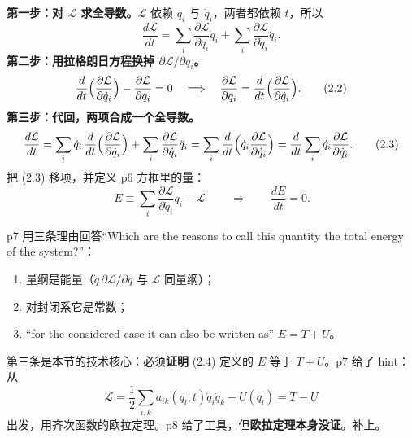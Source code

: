 \documentclass[11pt]{ctexart}
\begin{document}
\textbf{第一步：对 $\mathcal{L}$ 求全导数。}$\mathcal{L}$ 依赖 $q_i$ 与 $\dot q_i$，两者都依赖 $t$，所以
\[
\frac{d\mathcal{L}}{dt}=\sum_i\frac{\partial\mathcal{L}}{\partial q_i}\dot q_i+\sum_i\frac{\partial\mathcal{L}}{\partial\dot q_i}\ddot q_i. \tag{2.1}
\]
\textbf{第二步：用拉格朗日方程换掉 $\partial\mathcal{L}/\partial q_i$。}
\[
\frac{d}{dt}\Bigl(\frac{\partial\mathcal{L}}{\partial\dot q_i}\Bigr)-\frac{\partial\mathcal{L}}{\partial q_i}=0
\quad\Longrightarrow\quad
\frac{\partial\mathcal{L}}{\partial q_i}=\frac{d}{dt}\Bigl(\frac{\partial\mathcal{L}}{\partial\dot q_i}\Bigr). \tag{2.2}
\]
\textbf{第三步：代回，两项合成一个全导数。}
\[
\frac{d\mathcal{L}}{dt}
=\sum_i\dot q_i\,\frac{d}{dt}\Bigl(\frac{\partial\mathcal{L}}{\partial\dot q_i}\Bigr)+\sum_i\frac{\partial\mathcal{L}}{\partial\dot q_i}\ddot q_i
=\sum_i\frac{d}{dt}\Bigl(\dot q_i\frac{\partial\mathcal{L}}{\partial\dot q_i}\Bigr)
=\frac{d}{dt}\sum_i\dot q_i\frac{\partial\mathcal{L}}{\partial\dot q_i}. \tag{2.3}
\]
把 (2.3) 移项，并定义 p6 方框里的量：
\[
\boxed{\,E\equiv\sum_i\frac{\partial\mathcal{L}}{\partial\dot q_i}\dot q_i-\mathcal{L}\,}
\qquad\Longrightarrow\qquad
\frac{dE}{dt}=0 . \tag{2.4}
\]




p7 用三条理由回答“Which are the reasons to call this quantity the total energy of the system?”：
\begin{enumerate}
\item 量纲是能量（$\dot q\,\partial\mathcal{L}/\partial\dot q$ 与 $\mathcal{L}$ 同量纲）；
\item 对封闭系它是常数；
\item “for the considered case it can also be written as” $E=T+U$。
\end{enumerate}
第三条是本节的技术核心：必须\textbf{证明} (2.4) 定义的 $E$ 等于 $T+U$。p7 给了 hint：从
\[
\mathcal{L}=\frac12\sum_{i,k}a_{ik}(q_l,t)\dot q_i\dot q_k-U(q_l)=T-U
\]
出发，用齐次函数的欧拉定理。p8 给了工具，但\textbf{欧拉定理本身没证}。补上。
\end{document}
